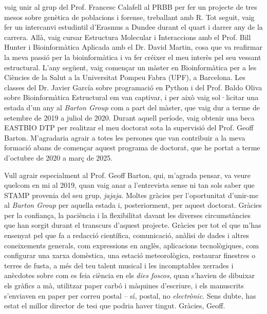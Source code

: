 vaig unir al grup del Prof. Francesc Calafell al PRBB per fer un projecte de tres mesos sobre genètica de poblacions i forense, treballant amb R. Tot seguit, vaig fer un intercanvi estudintil d'Erasmus a Dundee durant el quart i darrer any de la carrera. Allà, vaig cursar Estructura Molecular i Interaccions amb el Prof. Bill Hunter i Bioinformàtica Aplicada amb el Dr. David Martin, cosa que va reafirmar la meva passió per la bioinformàtica i va fer créixer el meu interès pel seu vessant estructural. L'any següent, vaig començar un màster en Bioinformàtica per a les Ciències de la Salut a la Universitat Pompeu Fabra (UPF), a Barcelona. Les classes del Dr. Javier García sobre programació en Python i del Prof. Baldo Oliva sobre Bioinformàtica Estructural em van captivar, i per això vaig sol·licitar una estada d'un any al \textit{Barton Group} com a part del màster, que vaig dur a terme de setembre de 2019 a juliol de 2020. Durant aquell període, vaig obtenir una beca EASTBIO DTP per realitzar el meu doctorat sota la supervisió del Prof. Geoff Barton. M'agradaria agrair a totes les persones que van contribuir a la meva formació abans de començar aquest programa de doctorat, que he portat a terme d'octubre de 2020 a març de 2025.

Vull agrair especialment al Prof. Geoff Barton, qui, m'agrada pensar, va veure quelcom en mi al 2019, quan vaig anar a l'entrevista sense ni tan sols saber que STAMP provenia del seu grup, \textit{jajaja}. Moltes gràcies per l'oportunitat d'unir-me al \textit{Barton Group} per aquella estada i, posteriorment, per aquest doctorat. Gràcies per la confiança, la paciència i la flexibilitat davant les diverses circumstàncies que han sorgit durant el transcurs d'aquest projecte. Gràcies per tot el que m'has ensenyat pel que fa a redacció científica, comunicació, anàlisi de dades i altres coneixements generals, com expressions en anglès, aplicacions tecnològiques, com configurar una xarxa domèstica, una estació meteorològica, restaurar finestres o terres de fusta, a més del teu talent musical i les incomptables xerrades i anècdotes sobre com es feia ciència en els \textit{dies foscos}, quan s'havien de dibuixar els gràfics a mà, utilitzar paper carbó i màquines d'escriure, i els manuscrits s'enviaven en paper per correu postal -- sí, postal, no \textit{electrònic}. Sens dubte, has estat el millor director de tesi que podria haver tingut. Gràcies, Geoff.

